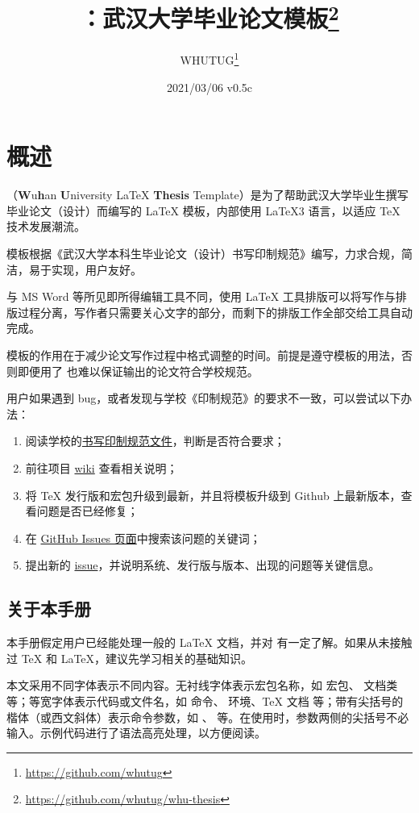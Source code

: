 \documentclass{fdudoc}
\title{\cls{whu-thesis}\bfseries ：武汉大学毕业论文模板\thanks{\url{https://github.com/whutug/whu-thesis}}}
\author{WHUTUG\thanks{\url{https://github.com/whutug}}}
\date{2021/03/06 \quad v0.5c}
\begin{document}
\maketitle
\tableofcontents

\section{概述}
（\textbf{W}u\textbf{h}an \textbf{U}niversity \LaTeX{} \textbf{Thesis} Template）是为了帮助武汉大学毕业生撰写毕业论文（设计）而编写的 \LaTeX{} 模板，内部使用 \LaTeX3 语言，以适应 \TeX{} 技术发展潮流。

模板根据《武汉大学本科生毕业论文（设计）书写印制规范》编写，力求合规，简洁，易于实现，用户友好。

与 MS Word 等所见即所得编辑工具不同，使用 \LaTeX{} 工具排版可以将写作与排版过程分离，写作者只需要关心文字的部分，而剩下的排版工作全部交给工具自动完成。

模板的作用在于减少论文写作过程中格式调整的时间。前提是遵守模板的用法，否则即便用了  也难以保证输出的论文符合学校规范。

用户如果遇到 bug，或者发现与学校《印制规范》的要求不一致，可以尝试以下办法：
\begin{enumerate}
    \item 阅读学校的\href{https://github.com/mtobeiyf/whu-thesis/files/4638713/default.pdf}{书写印制规范文件}，判断是否符合要求；
    \item 前往项目 \href{https://github.com/mtobeiyf/whu-thesis/wiki}{wiki} 查看相关说明；
    \item 将 \TeX{} 发行版和宏包升级到最新，并且将模板升级到 Github 上最新版本，查看问题是否已经修复；
    \item 在 \href{https://github.com/mtobeiyf/whu-thesis/issues}{GitHub Issues 页面}中搜索该问题的关键词；
    \item 提出新的 \href{https://github.com/mtobeiyf/whu-thesis/issues}{issue}，并说明系统、发行版与版本、出现的问题等关键信息。
\end{enumerate}

\subsection*{关于本手册}
本手册假定用户已经能处理一般的 \LaTeX{} 文档，并对 \BibTeX{} 有一定了解。如果从未接触过 \TeX{} 和 \LaTeX{}，建议先学习相关的基础知识。

本文采用不同字体表示不同内容。无衬线字体表示宏包名称，如  宏包、 文档类等；等宽字体表示代码或文件名，如  命令、 环境、\TeX{} 文档  等；带有尖括号的楷体（或西文斜体）表示命令参数，如 、 等。在使用时，参数两侧的尖括号不必输入。示例代码进行了语法高亮处理，以方便阅读。
\end{document}
